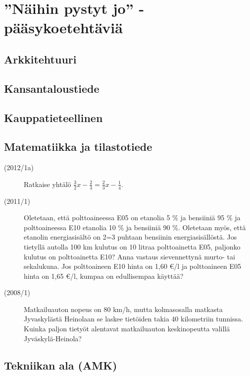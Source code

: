 \chapter{''Näihin pystyt jo'' -pääsykoetehtäviä}

\section{Arkkitehtuuri}

\section{Kansantaloustiede}

\section{Kauppatieteellinen}

\section{Matematiikka ja tilastotiede}

\begin{description}
	\item[(2012/1a)] Ratkaise yhtälö $\frac{3}{2}x - \frac{2}{3} = \frac{2}{3}x - \frac{1}{4}$.
	\item[(2011/1)] Oletetaan, että polttoaineessa E05 on etanolia 5 \% ja bensiiniä 95 \% ja polttoaineessa E10 etanolia 			10 \% ja bensiiniä 90 \%. Oletetaan myös, että etanolin energiasisältö on 2=3 puhtaan bensiinin
		energiasisällöstä. Jos tietyllä autolla 100 km kulutus on 10 litraa polttoainetta E05, paljonko kulutus on 
		polttoainetta E10? Anna vastaus sievennettynä murto- tai sekalukuna. Jos polttoaineen 
		E10 hinta on 1,60 €/l ja polttoaineen E05 hinta on 1,65 €/l, kumpaa on edullisempaa käyttää?
	\item[(2008/1)] Matkailuauton nopeus on 80 km/h, mutta kolmasosalla matkasta Jyvaskylästä Heinolaan se laskee tietöiden takia 40 kilometriin tunnissa. Kuinka paljon tietyöt alentavat matkailuauton keskinopeutta valillä Jyväskylä-Heinola?
\end{description}

\section{Tekniikan ala (AMK)}

